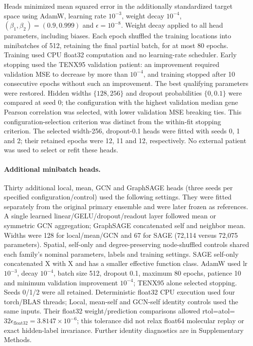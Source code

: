 Heads minimized mean squared error in the additionally standardized target space using AdamW, learning rate $10^{-3}$, weight decay $10^{-4}$, $(\beta_1,\beta_2)=(0.9, 0.999)$ and $\epsilon=10^{-8}$. Weight decay applied to all head parameters, including biases. Each epoch shuffled the training locations into minibatches of 512, retaining the final partial batch, for at most 80 epochs. Training used CPU float32 computation and no learning-rate scheduler. Early stopping used the TENX95 validation patient: an improvement required validation MSE to decrease by more than $10^{-4}$, and training stopped after 10 consecutive epochs without such an improvement. The best qualifying parameters were restored. Hidden widths $\{128,256\}$ and dropout probabilities $\{0, 0.1\}$ were compared at seed 0; the configuration with the highest validation median gene Pearson correlation was selected, with lower validation MSE breaking ties. This configuration-selection criterion was distinct from the within-fit stopping criterion. The selected width-256, dropout-0.1 heads were fitted with seeds 0, 1 and 2; their retained epochs were 12, 11 and 12, respectively. No external patient was used to select or refit these heads.


\paragraph{Additional minibatch heads.}
Thirty additional local, mean, GCN and GraphSAGE heads (three seeds per specified configuration/control) used the following settings. They were fitted separately from the original primary ensemble and were later frozen as references.
A single learned linear/GELU/dropout/readout layer followed mean or symmetric GCN aggregation; GraphSAGE concatenated self and neighbor mean. Widths were 128 for local/mean/GCN and 67 for SAGE (72,114 versus 72,075 parameters). Spatial, self-only and degree-preserving node-shuffled controls shared each family's nominal parameters, labels and training settings. SAGE self-only concatenated X with X and has a smaller effective function class. AdamW used lr $10^{-3}$, decay $10^{-4}$, batch size 512, dropout 0.1, maximum 80 epochs, patience 10 and minimum validation improvement $10^{-4}$; TENX95 alone selected stopping. Seeds 0/1/2 were all retained. Deterministic float32 CPU execution used four torch/BLAS threads; Local, mean-self and GCN-self identity controls used the same inputs. Their float32 weight/prediction comparisons allowed rtol=atol=$32\epsilon_{\mathrm{float32}}=3.8147\times10^{-6}$; this tolerance did not relax float64 molecular replay or exact hidden-label invariance. Further identity diagnostics are in Supplementary Methods.

